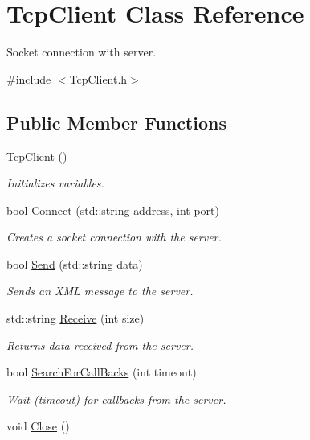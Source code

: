 \hypertarget{classTcpClient}{\section{Tcp\-Client Class Reference}
\label{classTcpClient}
}


Socket connection with server.  




{\ttfamily \#include $<$Tcp\-Client.\-h$>$}

\subsection*{Public Member Functions}
\begin{DoxyCompactItemize}
\item 
\hypertarget{classTcpClient_ad2e6b99a63964caa825c44e93ff8e777}{\hyperlink{classTcpClient_ad2e6b99a63964caa825c44e93ff8e777}{Tcp\-Client} ()}\label{classTcpClient_ad2e6b99a63964caa825c44e93ff8e777}

\begin{DoxyCompactList}\small\item\em Initializes variables. \end{DoxyCompactList}\item 
bool \hyperlink{classTcpClient_ac2e9bb63b4e0dc8f4508aa2a85431fe2}{Connect} (std\-::string \hyperlink{classTcpClient_a8bcb24ebf1d8e22e9185f3056fd108c4}{address}, int \hyperlink{classTcpClient_aa112ef0470437e790931b3ec9c98a800}{port})
\begin{DoxyCompactList}\small\item\em Creates a socket connection with the server. \end{DoxyCompactList}\item 
bool \hyperlink{classTcpClient_acac6ca70c9d99e09731181e5239381ae}{Send} (std\-::string data)
\begin{DoxyCompactList}\small\item\em Sends an X\-M\-L message to the server. \end{DoxyCompactList}\item 
std\-::string \hyperlink{classTcpClient_aa000d653ba13fb447642e81890cdc866}{Receive} (int size)
\begin{DoxyCompactList}\small\item\em Returns data received from the server. \end{DoxyCompactList}\item 
bool \hyperlink{classTcpClient_a4df900657b1cb45aced143fe21a81937}{Search\-For\-Call\-Backs} (int timeout)
\begin{DoxyCompactList}\small\item\em Wait (timeout) for callbacks from the server. \end{DoxyCompactList}\item 
\hypertarget{classTcpClient_ae7a96d69db612ef4827ee23c31332a4e}{void \hyperlink{classTcpClient_ae7a96d69db612ef4827ee23c31332a4e}{Close} ()}\label{classTcpClient_ae7a96d69db612ef4827ee23c31332a4e}


\end{DoxyCompactItemize}
